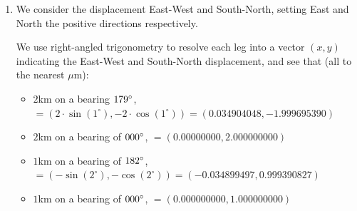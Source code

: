 \documentclass{article}
\begin{document}
\begin{enumerate}
\begin{enumerate}

    \item The quickest journey, now rounded, becomes: \begin{itemize}
    \item Travel $50$ km an a bearing of $124^\circ$ 
    \item Travel $50$ km on a bearing of $123^\circ$
    \end{itemize}
    Applying the cosine rule as per the previous section, this covers:
    $$
    \sqrt{50^2 + 50^2 - 2 \cdot 50 \cdot 50 \cdot \cos(179^\circ)} = 99.99619 \; \text{km} \quad \text{(nearest cm)}
    $$
    As this also travels from the origin, at an angle of $123.5^\circ$ from North, we have that the distance from the gold is:
    $$
    100 - 99.99619 - 0.00381 \; \text{km} = 3.81 \; \text{m}
    $$
    \end{enumerate}

    Thus, neither you, Bob nor Rob end up within $1$m of the gold, and it remains buried.

    \item We consider the displacement East-West and South-North, setting East and North the positive directions respectively.

   We use right-angled trigonometry to resolve each leg into a vector $(x,y)$ indicating the East-West and South-North displacement, and see that (all to the nearest $\mu$m):

    \begin{itemize}
    \item $2$km on a bearing $179\degree$, $=(2 \cdot \sin(1^\circ), -2 \cdot \cos(1^\circ)) = (0.034904048, -1.999695390) $
    \item $2$km on a bearing of $000\degree$, $ = (0.00000000, 2.000000000)$
    \item $1$km on a bearing of $182\degree$, $ = (-\sin(2^\circ), -\cos(2^\circ)) = (-0.034899497, 0.999390827)$
    \item $1$km on a bearing of $000\degree$, $= (0.000000000,1.000000000)$
    \end{itemize}


\end{enumerate}
\end{document}
